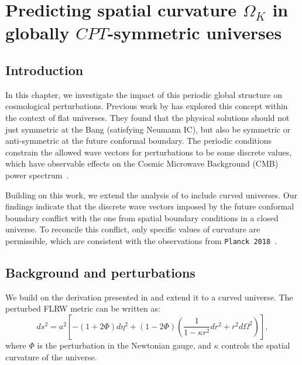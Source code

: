 
\chapter{Predicting spatial curvature $\Omega_K$ in globally $CPT$-symmetric universes}\label{chapter:theory} %



\section{Introduction}

In this chapter, we investigate the impact of this periodic global structure on cosmological perturbations. Previous work by \citet{2022PhRvD.105h3514L} has explored this concept within the context of flat universes. They found that the physical solutions should not just symmetric at the Bang (satisfying Neumann IC), but also be symmetric or anti-symmetric at the future conformal boundary. The periodic conditions constrain the allowed wave vectors for perturbations to be some discrete values, which have observable effects on the Cosmic Microwave Background (CMB) power spectrum~\cite{2022PhRvD.105h3515B,2022PhRvD.105l3508P}.

Building on this work, we extend the analysis of \citet{2022PhRvD.105h3514L} to include curved universes. Our findings indicate that the discrete wave vectors imposed by the future conformal boundary conflict with the one from spatial boundary conditions in a closed universe. To reconcile this conflict, only specific values of curvature are permissible, which are consistent with the observations from \texttt{Planck 2018}~\cite{2020A&A...641A...6P}. 

\section{Background and perturbations} 
We build on the derivation presented in \citet{2022PhRvD.105h3514L} and extend it to a curved universe. The perturbed FLRW metric can be written as:
\begin{equation}
    ds^2 = a^2 \left[-(1 + 2\Phi)d\eta^2 + (1 - 2\Phi)\left(\frac{1}{1-\kappa r^2}dr^2+r^2d\Omega^2\right) \right],
\end{equation}
where \(\Phi\) is the perturbation in the Newtonian gauge, and $\kappa$ controls the spatial curvature of the universe.

